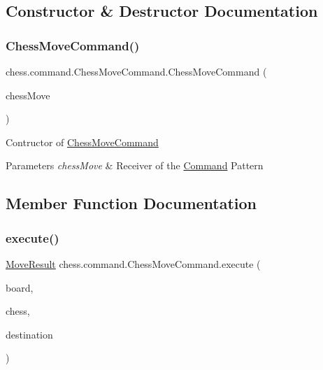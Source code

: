 \subsection{Constructor \& Destructor Documentation}
\mbox{\label{classchess_1_1command_1_1_chess_move_command_a015eb289219c05fd0ee4009d939b25bc}} 
\subsubsection{\texorpdfstring{Chess\+Move\+Command()}{ChessMoveCommand()}}
{\footnotesize\ttfamily chess.\+command.\+Chess\+Move\+Command.\+Chess\+Move\+Command (\begin{DoxyParamCaption}\item[{\mbox{\hyperlink{classchess_1_1command_1_1_chess_move}{Chess\+Move}}}]{chess\+Move }\end{DoxyParamCaption})}

Contructor of \mbox{\hyperlink{classchess_1_1command_1_1_chess_move_command}{Chess\+Move\+Command}}


\begin{DoxyParams}{Parameters}
{\em chess\+Move} & Receiver of the \mbox{\hyperlink{interfacechess_1_1command_1_1_command}{Command}} Pattern \\
\hline
\end{DoxyParams}


\subsection{Member Function Documentation}
\mbox{\label{classchess_1_1command_1_1_chess_move_command_a7a74fa700b53038f06de08a11699d37e}} 
\subsubsection{\texorpdfstring{execute()}{execute()}}
{\footnotesize\ttfamily \mbox{\hyperlink{enumchess_1_1models_1_1enums_1_1_move_result}{Move\+Result}} chess.\+command.\+Chess\+Move\+Command.\+execute (\begin{DoxyParamCaption}\item[{\mbox{\hyperlink{classchess_1_1models_1_1_board}{Board}}}]{board,  }\item[{\mbox{\hyperlink{classchess_1_1models_1_1_chess_piece}{Chess\+Piece}}}]{chess,  }\item[{\mbox{\hyperlink{classchess_1_1models_1_1_position}{Position}}}]{destination }\end{DoxyParamCaption})}


